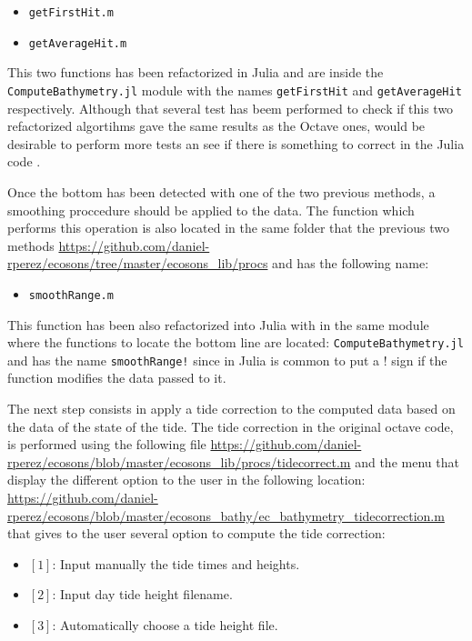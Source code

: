 \documentclass{article}[a4paper, 12pt]
\begin{document}
\begin{itemize}
    \item \texttt{getFirstHit.m}
    \item \texttt{getAverageHit.m}
\end{itemize}

This two functions has been refactorized in Julia and are inside the \texttt{ComputeBathymetry.jl} module with the names \texttt{getFirstHit} and \texttt{getAverageHit} respectively. Although that several test has beem performed to check if this two refactorized algortihms gave the same results as the Octave ones, would be desirable to perform more tests an see if there is something to correct in the Julia code .


Once the bottom has been detected with one of the two previous methods, a smoothing proccedure should be applied to the data. The function which performs this operation is also located in the same folder that the previous two methods  \url{https://github.com/daniel-rperez/ecosons/tree/master/ecosons_lib/procs} and has the following name:

\begin{itemize}
    \item \texttt{smoothRange.m}
\end{itemize}

This function has been also refactorized into Julia with in the same module where the functions to locate the bottom line are located: \texttt{ComputeBathymetry.jl} and has the name \texttt{smoothRange!} since in Julia is common to put a ! sign if the function modifies the data passed to it.

\vspace{1cm}

The next step consists in apply a tide correction to the computed data based on the data of the state of the tide. The tide correction in the original octave code, is performed using the following file \url{https://github.com/daniel-rperez/ecosons/blob/master/ecosons_lib/procs/tidecorrect.m} and the menu that display the different option to the user in the following location: \url{https://github.com/daniel-rperez/ecosons/blob/master/ecosons_bathy/ec_bathymetry_tidecorrection.m} that gives to the user several option to compute the tide correction:

\begin{itemize}
    \item $[1]$: Input manually the tide times and heights.
    \item $[2]$: Input day tide height filename.  
    \item $[3]$: Automatically choose a tide height file.  
\end{itemize}
\end{document}
